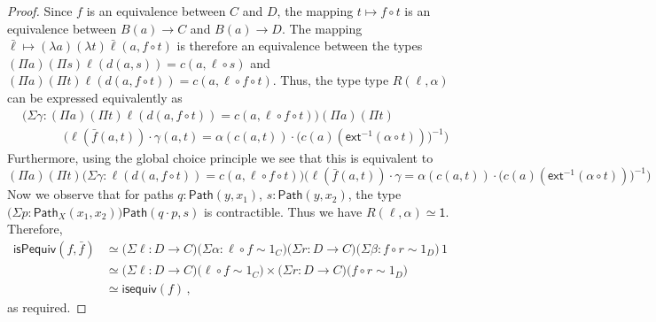 \documentclass[10pt,a4paper,oneside,reqno]{amsart}
\numberwithin{equation}{section}
\theoremstyle{mythm}
\theoremstyle{mydef}
\theoremstyle{myrmk}
\newcommand{\co}{\colon}
\newcommand{\comp}{\circ}
\newcommand{\ct}{\cdot}
\newcommand{\isequiv}{\mathsf{isequiv}}
\newcommand{\ext}{\mathsf{ext}}
\newcommand{\Id}{\mathsf{Path}}
\newcommand{\one}{\mathsf{1}}
\begin{document}
\begin{proof}
Since $f$ is an equivalence between $C$ and $D$, the mapping $t \mapsto f \comp t$ is an equivalence between $B(a) \to C$ and $B(a) \to D$. The mapping $\bar{\ell} \mapsto (\lambda a) (\lambda t) \bar{\ell}(a,f \comp t)$ is therefore an equivalence between the types $(\Pi a) (\Pi s) \ell(d(a,s)) = c(a,\ell \comp s)$ and $(\Pi a) (\Pi t) \ell(d(a,f \comp t)) = c(a,\ell \comp f \comp t)$. Thus, the type type $R(\ell,\alpha)$ can be expressed equivalently as
\begin{align*}
& \big(\Sigma \gamma : (\Pi a) (\Pi t) \ell(d(a,f \circ t))=c(a,\ell \circ f \circ t)\big) (\Pi a) (\Pi t) \\ & \;\;\;\;\;\;\;\;\;\;\;\; \Big(\ell(\bar{f}(a,t)) \ct \gamma(a,t) = \alpha(c(a,t)) \ct \big(c(a)(\ext^{-1}(\alpha \circ t))\big)^{-1}\Big)
\end{align*}
Furthermore, using the global choice principle we see that this is equivalent to
\[ (\Pi a) (\Pi t) \big(\Sigma \gamma : \ell(d(a,f \circ t))=c(a,\ell \circ f \circ t)\big) \Big(\ell(\bar{f}(a,t)) \ct \gamma = \alpha(c(a,t)) \ct \big(c(a)(\ext^{-1}(\alpha \circ t))\big)^{-1}\Big) \]
Now we observe that for paths $q : \Id(y,x_1)$, $s : \Id(y,x_2)$, the type $\big(\Sigma p : \Id_X(x_1,x_2)\big) \Id(q \ct p,s)$ is contractible. Thus we have $R(\ell,\alpha) \simeq \one$. Therefore,
\begin{align*} 
\mathsf{isPequiv}(f,\bar{f}) 
  & \simeq   \big(\Sigma \ell \co D \to C \big) \big(\Sigma \alpha : \ell \comp f \sim 1_C \big) \big(\Sigma r  \co D \to C \big) 
 \big(\Sigma \beta \co f \comp r \sim 1_D \big) \, 1 \\
 & \simeq \big(\Sigma \ell \co D \to C \big)  \big( \ell \comp f \sim 1_C \big) \times 
 \big(\Sigma r  \co D \to C \big) \big( f \comp r \sim 1_D \big) \\
 & \simeq \isequiv(f) \, ,
\end{align*} 
as required.
\end{proof}
\end{document}
